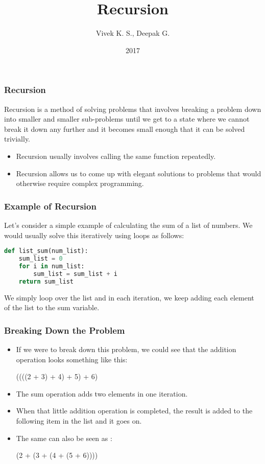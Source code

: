 \documentclass{beamer}
\title{Recursion}
\author{Vivek K. S., Deepak G.}
\institute{Information Systems Decision Sciences (ISDS)\\
MUMA College of Business\\
University of South Florida \\
Tampa, Florida}
\date{2017}
\begin{document}
\frame{\titlepage}

\begin{frame}
\frametitle{Recursion}
Recursion is a method of solving problems that involves breaking a problem down into smaller
and smaller sub-problems until we get to a state where we cannot break it down any further and it becomes small enough that it can be solved trivially.
\begin{itemize}
\item Recursion usually involves calling the same function repeatedly.
\item Recursion allows us to come up with elegant solutions to problems that would otherwise require complex programming.
\end{itemize}
\end{frame}

\begin{frame}[fragile]
\frametitle{Example of Recursion}
Let's consider a simple example of calculating the sum of a list of numbers. We would usually solve this iteratively using loops as follows:
\begin{lstlisting}[language=Python]
def list_sum(num_list):
    sum_list = 0
    for i in num_list:
        sum_list = sum_list + i
    return sum_list
\end{lstlisting}
We simply loop over the list and in each iteration, we keep adding each element of the list to the sum variable.
\end{frame}

\begin{frame}[fragile]
\frametitle{Breaking Down the Problem}

\begin{itemize}
\item If we were to break down this problem, we could see that the addition operation looks something like this:

((((2 + 3) + 4) + 5) + 6)
\item The sum operation adds two elements in one iteration.
\item When that little addition operation is completed, the result is added to the following item in the list and it goes on.
\item The same can also be seen as :

(2 + (3 + (4 + (5 + 6))))
\end{itemize}
\end{frame}
\end{document}
